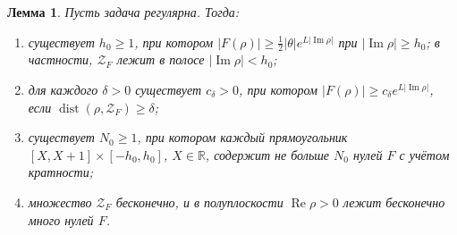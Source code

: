 \documentclass[12pt,a4paper]{article}
\numberwithin{equation}{section}
\newtheorem{lemma}{Лемма}
\theoremstyle{definition}
\newcommand{\R}{\mathbb R}
\newcommand{\abs}[1]{\lvert#1\rvert}
\newcommand{\Imm}{\operatorname{Im}}
\newcommand{\Ree}{\operatorname{Re}}
\newcommand{\Zf}{\mathcal Z_F}
\begin{document}
\begin{lemma}\label{lem:F}
Пусть задача регулярна. Тогда:
\begin{enumerate}
\item[(a)] существует $h_0\ge1$, при котором $\abs{F(\rho)}\ge\frac12\abs\theta e^{L\abs{\Imm\rho}}$
 при $\abs{\Imm\rho}\ge h_0$; в частности, $\Zf$ лежит в полосе $\abs{\Imm\rho}<h_0$;
\item[(b)] для каждого $\delta>0$ существует $c_\delta>0$, при котором
 $\abs{F(\rho)}\ge c_\delta e^{L\abs{\Imm\rho}}$, если $\operatorname{dist}(\rho,\Zf)\ge\delta$;
\item[(c)] существует $N_0\ge1$, при котором каждый прямоугольник $[X,X+1]\times[-h_0,h_0]$,
 $X\in\R$, содержит не больше $N_0$ нулей $F$ с учётом кратности;
\item[(d)] множество $\Zf$ бесконечно, и в полуплоскости $\Ree\rho>0$ лежит бесконечно много нулей $F$.
\end{enumerate}
\end{lemma}
\end{document}
